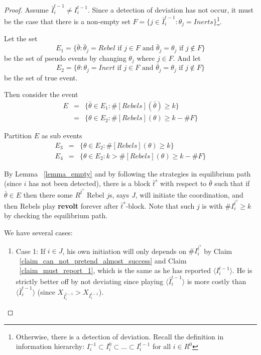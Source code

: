 \documentclass[12pt,letter]{article}
\theoremstyle{definition}
\theoremstyle{remark}
\theoremstyle{claim}
\begin{document}
\begin{proof}
Assume $\bar{I}^{t-1}_i\neq I^{t-1}_i$. Since a detection of deviation has not occur, it must be the case that there is a non-empty set $F=\{j\in \bar{I}^{t-1}_i:\theta_j=Inerts\}$\footnote{Otherwise, there is a detection of deviation. Recall the definition in information hierarchy: $I^{-1}_i\subset I^{0}_i\subset...\subset I^{t-1}_i$ for all $i\in R^0$}. 


Let the set 
\[E_1=\{\bar{\theta}: \bar{\theta}_j=Rebel \text{ if } j\in F \text { and }\bar{\theta}_j=\theta_j \text{ if } j\notin F\}\]
be the set of pseudo events by changing $\theta_j$ where $j\in F$. And let
\[E_2=\{\theta: \theta_j=Inert \text{ if }j\in F \text { and }\bar{\theta}_j=\theta_j \text{ if } j\notin F\}\]
be the set of true event.

Then consider the event
\begin{eqnarray*}
E 	&= &\{\bar{\theta}\in E_1: \#[Rebels](\bar{\theta})\geq k\}\\
 	&= &\{\theta\in E_2: \#[Rebels](\theta)\geq k-\#F\}
\end{eqnarray*}

Partition $E$ as sub events
\begin{eqnarray*}
E_3 	&= &\{\theta\in E_2: \#[Rebels](\theta)\geq k\}\\
E_4 	&= &\{\theta\in E_2: k>\#[Rebels](\theta)\geq k-\#F\}
\end{eqnarray*}

By Lemma ~\ref{lemma_empty} and by following the strategies in equilibrium path (since $i$ has not been detected), there is a block $\bar{t}^{s}$ with respect to $\bar{\theta}$ such that if $\bar{\theta}\in E$ then there some $R^{\bar{t}^s}$ Rebel $j$s, says $J$, will initiate the coordination, and then Rebels play \textbf{revolt} forever after $\bar{t}^s$-block. Note that such $j$ is with $\# {I}^{\bar{t}^{s}}_i \geq k$ by checking the equilibrium path.

We have several cases:
\begin{enumerate}
\item Case 1: If $i\in J$, his own initiation will only depends on $\# I^{\bar{t}^s}_i$ by Claim ~\ref{claim_can_not_pretend_almost_success} and Claim ~\ref{claim_must_report_1}, which is the same as he has reported $\langle {I}^{t-1}_i\rangle$. He is strictly better off by not deviating since playing $\langle\bar{I}^{t-1}_i\rangle$ is more costly than $\langle\bar{I}^{t-1}_i\rangle$ (since $X_{\bar{I}^{t-1}_i}>X_{I^{t-1}_i}$).


\end{enumerate}
\end{proof}
\end{document}
